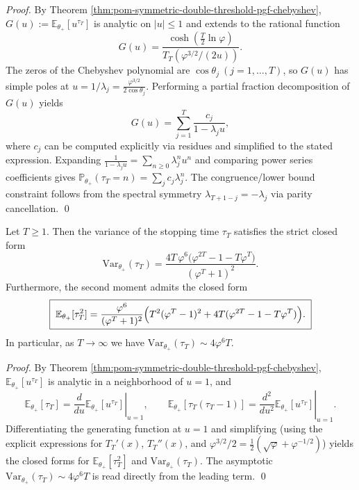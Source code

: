 \begin{proof}
By Theorem \ref{thm:pom-symmetric-double-threshold-pgf-chebyshev},
\(
G(u):=\mathbb{E}_{\theta_+}[u^{\tau_T}]
\)
is analytic on \(|u|\le 1\) and extends to the rational function
\[
G(u)=\frac{\cosh(\tfrac{T}{2}\ln\varphi)}{T_T(\varphi^{3/2}/(2u))}.
\]
The zeros of the Chebyshev polynomial are
\(
\cos\theta_j\ (j=1,\dots,T)
\), so \(G(u)\) has simple poles at
\(
u=1/\lambda_j=\frac{\varphi^{3/2}}{2\cos\theta_j}
\).
Performing a partial fraction decomposition of \(G(u)\) yields
\[
G(u)=\sum_{j=1}^{T}\frac{c_j}{1-\lambda_j u},
\]
where \(c_j\) can be computed explicitly via residues and simplified to the stated expression.
Expanding \(\frac{1}{1-\lambda_j u}=\sum_{n\ge 0}\lambda_j^n u^n\) and comparing power series coefficients gives
\(
\mathbb{P}_{\theta_+}(\tau_T=n)=\sum_j c_j\lambda_j^n
\).
The congruence/lower bound constraint follows from the spectral symmetry \(\lambda_{T+1-j}=-\lambda_j\) via parity cancellation. \qed
\end{proof}

\begin{proposition}\label{prop:pom-tau-second-moment-variance-closed}
Let \(T\ge 1\).
Then the variance of the stopping time \(\tau_T\) satisfies the strict closed form
\[
\boxed{\;
\mathrm{Var}_{\theta_+}(\tau_T)
=\frac{4T\,\varphi^{6}\bigl(\varphi^{2T}-1-T\varphi^{T}\bigr)}{(\varphi^{T}+1)^2}.\;}
\]
Furthermore, the second moment admits the closed form
\[
\boxed{\;
\mathbb{E}_{\theta_+}[\tau_T^2]
=\frac{\varphi^{6}}{(\varphi^{T}+1)^2}\Bigl(T^2(\varphi^{T}-1)^2+4T(\varphi^{2T}-1-T\varphi^{T})\Bigr).\;}
\]
In particular, as \(T\to\infty\) we have \(\mathrm{Var}_{\theta_+}(\tau_T)\sim 4\varphi^{6}T\).
\end{proposition}

\begin{proof}
By Theorem \ref{thm:pom-symmetric-double-threshold-pgf-chebyshev}, \(\mathbb{E}_{\theta_+}[u^{\tau_T}]\) is analytic in a neighborhood of \(u=1\), and
\[
\mathbb{E}_{\theta_+}[\tau_T]=\left.\frac{d}{du}\mathbb{E}_{\theta_+}[u^{\tau_T}]\right|_{u=1},\qquad
\mathbb{E}_{\theta_+}[\tau_T(\tau_T-1)]=\left.\frac{d^2}{du^2}\mathbb{E}_{\theta_+}[u^{\tau_T}]\right|_{u=1}.
\]
Differentiating the generating function at \(u=1\) and simplifying (using the explicit expressions for \(T_T'(x)\), \(T_T''(x)\), and \(\varphi^{3/2}/2=\tfrac12(\sqrt\varphi+\varphi^{-1/2})\)) yields the closed forms for \(\mathbb{E}_{\theta_+}[\tau_T^2]\) and \(\mathrm{Var}_{\theta_+}(\tau_T)\).
The asymptotic \(\mathrm{Var}_{\theta_+}(\tau_T)\sim 4\varphi^{6}T\) is read directly from the leading term. \qed
\end{proof}

